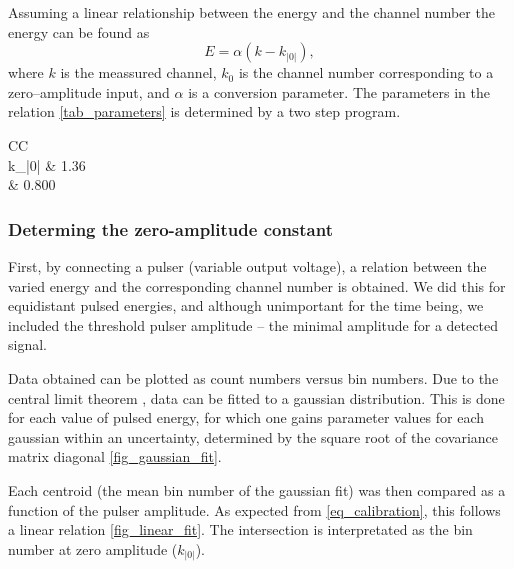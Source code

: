 Assuming a linear relationship between the energy and the channel number the
energy can be found as
\begin{equation}
    E = \alpha(k - k_|0|), \label{eq_calibration}
\end{equation}
where $k$ is the meassured channel, $k_0$ is the channel number corresponding to
a zero--amplitude input, and $\alpha$ is a conversion parameter.
The parameters in the relation \cref{tab_parameters} is determined by a two
step program.

\begin{table}[b]
\centering
\caption{The values of the parameters, used to convert channel numbers to
energies.}
\begin{tabular}{CC}
\toprule
{}\\
\midrule
k_|0| & 1.36 \\
\alpha & 0.800  \\
\bottomrule
\end{tabular}

\label{tab_parameters}
\end{table}

\subsubsection{Determing the zero-amplitude constant}
First, by connecting a pulser (variable output voltage), a relation between the
varied energy and the corresponding channel number is obtained. 
We did this for equidistant pulsed energies, and although unimportant for the
time being, we included the threshold pulser amplitude -- the minimal amplitude
for a detected signal.

Data obtained can be plotted as count numbers versus bin numbers. Due to the
central limit theorem \parencite[p. 49]{statistics}, data can be fitted to a
gaussian distribution. This is done for each value of pulsed energy, for which
one gains parameter values for each gaussian within an uncertainty, determined
by the square root of the covariance matrix diagonal \cref{fig_gaussian_fit}.

Each centroid (the mean bin number of the gaussian fit) was then compared as a
function of the pulser amplitude. As expected from \cref{eq_calibration}, this
follows a linear relation \cref{fig_linear_fit}.
The intersection is interpretated as the bin number at zero amplitude ($k_|0|$).


